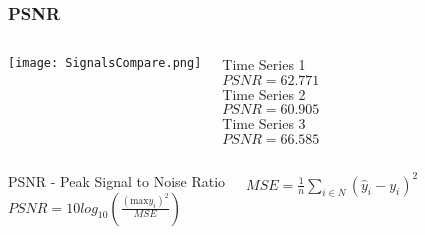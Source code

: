 \documentclass{beamer}
\begin{document}
\begin{frame}
\begin{center}
\frametitle{PSNR}

\begin{columns}


\texttt{[image: SignalsCompare.png]}


\centering

\small{

$ $\\

Time Series 1\\

$PSNR = 62.771$\\

$ $\\

$ $\\

$ $\\

Time Series 2\\

$PSNR = 60.905$\\

$ $\\

$ $\\

$ $\\

Time Series 3\\

$PSNR = 66.585$

$ $\\

}

\end{columns}

\small{

\begin{columns}

\column{2.5 in}

\centering

PSNR - Peak Signal to Noise Ratio\\

$PSNR = 10 log_{10} \left( \frac{\left(\mathrm{max} y_i \right) ^2}{MSE} \right)$\\

\column{2.5 in}

\centering

$MSE = \frac{1}{n} \sum _{i \in N} \left( \hat{y}_i - y_i \right) ^2$

\end{columns}

}

\end{center}
\end{frame}
\end{document}

